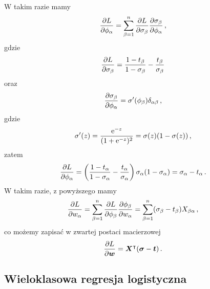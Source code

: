 \documentclass{myclass}
\begin{document}
W takim razie mamy
\[
\pdv{L}{\phi_\alpha} = \sum_{\beta=1}^n \pdv{L}{\sigma_\beta} \pdv{\sigma_\beta}{\phi_\alpha}\,,
\]
gdzie
\[
\pdv{L}{\sigma_\beta} = \frac{1 - t_\beta}{1 - \sigma_\beta} - \frac{t_\beta}{\sigma_\beta}
\]
oraz
\[
\pdv{\sigma_\beta}{\phi_\alpha} = \sigma'(\phi_\beta) \delta_{\alpha\beta}\,,
\]
gdzie
\[
\sigma'(z) = \frac{\mathrm{e}^{-z}}{(1 + \mathrm{e}^{-z})^2} = \sigma(z)(1 - \sigma(z))\,,
\]
zatem
\[
\pdv{L}{\phi_\alpha} = \left(\frac{1 - t_\alpha}{1 - \sigma_\alpha} - \frac{t_\alpha}{\sigma_\alpha}\right)\sigma_\alpha(1 - \sigma_\alpha) = \sigma_\alpha - t_\alpha\,.
\]
W takim razie, z powyższego mamy
\[
\pdv{L}{w_\alpha} = \sum_{\beta=1}^n \pdv{L}{\phi_\beta} \pdv{\phi_\beta}{w_\alpha} = \sum_{\beta=1}^n (\sigma_\beta - t_\beta) X_{\beta\alpha}\,,
\]
co możemy zapisać w zwartej postaci macierzowej
\[
\pdv{L}{\bm{w}} = \bm{X}^\intercal (\bm{\sigma} - \bm{t})\,.
\]

\subsection{Wieloklasowa regresja logistyczna}
\end{document}
